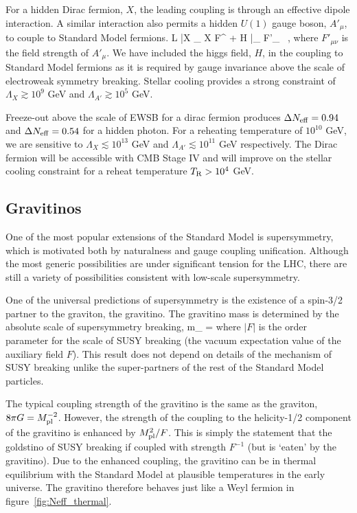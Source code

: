 For a hidden Dirac fermion, $X$, the leading coupling is through an effective dipole interaction.  A similar interaction also permits a hidden $U(1)$ gauge boson, $A'_\mu$, to couple to Standard Model fermions.
\beq
{\cal L} \supset  {} \bar X \sigma_{\mu\nu} X  F^{\mu \nu} +  H \bar \psi \sigma_{\mu\nu} \psi  F'_{\mu \nu}  \ ,
\eeq
where $F'_{\mu \nu}$ is the field strength of $A'_\mu$.  We have included the higgs field, $H$, in the coupling to Standard Model fermions as it is required by gauge invariance above the scale of electroweak symmetry breaking.  Stellar cooling provides a strong constraint of $\Lambda_X \gtrsim 10^9$ GeV and $\Lambda_{A'} \gtrsim 10^5$ GeV.  

Freeze-out above the scale of EWSB for a dirac fermion produces $\Delta N_{\rm eff} = 0.94$ and $\Delta N_{\rm eff} = 0.54$ for a hidden photon.  For a reheating temperature of $10^{10}$ GeV, we are sensitive to $\Lambda_X \lesssim 10^{13}$ GeV and $\Lambda_{A'}  \lesssim 10^{11}$ GeV respectively.  The Dirac fermion will be accessible with CMB Stage IV and will improve on the stellar cooling constraint for a reheat temperature $T_{\rm R} > 10^4$ GeV.

\subsection{Gravitinos}

One of the most popular extensions of the Standard Model is supersymmetry, which is motivated both by naturalness and gauge coupling unification.  Although the most generic possibilities are under significant tension for the LHC, there are still a variety of possibilities consistent with low-scale supersymmetry.

One of the universal predictions of supersymmetry is the existence of a spin-3/2 partner to the graviton, the gravitino.  The gravitino mass is determined by the absolute scale of supersymmetry breaking, 
\beq
m_{} = 
\eeq
where $|F|$ is the order parameter for the scale of SUSY breaking (the vacuum expectation value of the auxiliary field $F$).  This result does not depend on details of the mechanism of SUSY breaking unlike the super-partners of the rest of the Standard Model particles.

The typical coupling strength of the gravitino is the same as the graviton, $8 \pi G = M_{\rm pl}^{-2}$.  However, the strength of the coupling to the helicity-1/2 component of the gravitino is enhanced by $M_{\rm pl}^2 /F$.  This is simply the statement that the goldstino of SUSY breaking if coupled with strength $F^{-1}$ (but is `eaten' by the gravitino).  Due to the enhanced coupling, the gravitino can be in thermal equilibrium with the Standard Model at plausible temperatures in the early universe.  The gravitino therefore behaves just like a Weyl fermion in figure~\ref{fig:Neff_thermal}.

